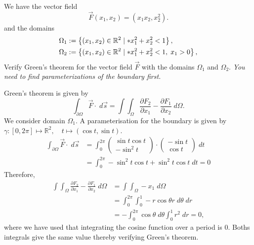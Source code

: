 \documentclass[11pt]{article}
\begin{document}
\begin{exercise}
    We have the vector field 
    \[
        \vec F( x_1, x_2 ) = \left( x_1 x_2, x_2^{2} \right).
    \]
    and the domains 
    \begin{align*}
        \Omega_1 &:= \left\{ (x_1,x_2) \in \bbR^{2} \suchthat* x_1^{2} + x_2^{2} < 1 \right\},
        \\
        \Omega_2 &:= \left\{ (x_1,x_2) \in \bbR^{2} \suchthat* x_1^{2} + x_2^{2} < 1, \; x_1 > 0 \right\},
     \end{align*}
    Verify Green's theorem for the vector field $\vec F$ with the domains $\Omega_1$ and $\Omega_2$. 
    \textit{You need to find parameterizations of the boundary first.}
\end{exercise}
\begin{solution}   
   Green's theorem is given by 
   \[
        \int_{\partial \Omega} \vec{F} \cdot \;d\vec{s} 
        = 
        \int \int_{\Omega} \frac{\partial F_2}{\partial x_1} - \frac{\partial F_1}{\partial x_2} \;d \Omega
        .
    \]
    We consider domain $\Omega_1$. 
    A parameterisation for the boundary is given by $\gamma: [0,2\pi] \mapsto \mathbb{R}^2, \quad t\mapsto  (\cos t, \sin t)$.
    \begin{align*}
        \int_{\partial \Omega} \vec{F} \cdot \;d\vec{s} &= \int_0^ {2\pi} \begin{pmatrix}\sin t \cos t\\ -\sin^2 t \end{pmatrix} \cdot \begin{pmatrix}-\sin t \\ \cos t \end{pmatrix} \; d t 
        \\&= \int_0^{2\pi} -\sin^2 t\cos t + \sin^ 2 t \cos t \;dt = 0
    \end{align*}
    Therefore, 
    \begin{align*}
        \int \int_{\Omega} \frac{\partial F_2}{\partial x_1} - \frac{\partial F_1}{\partial x_2} \;d \Omega &= \int \int_{\Omega} -x_1 \; d\Omega
        \\&= \int_0^ {2\pi} \int_0^1 -r\cos \theta r \;d\theta\;dr
        \\&= -\int_0^ {2\pi} \cos \theta \;d \theta \int_0^1 r^ 2 \;d r = 0,
    \end{align*}
    where we have used that integrating the cosine function over a period is $0$. Boths integrals give the same value thereby verifying Green's theorem.
    

\end{solution}
\end{document}
